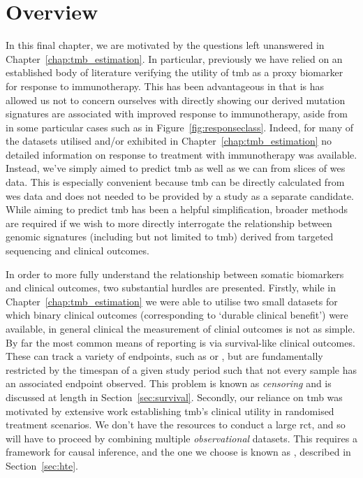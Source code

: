 \documentclass[../thesis.tex]{subfiles}
\begin{document}
\section{Overview}
In this final chapter, we are motivated by the questions left unanswered in Chapter~\ref{chap:tmb_estimation}. In particular, previously we have relied on an established body of literature verifying the utility of \gls{tmb} as a proxy biomarker for response to immunotherapy. This has been advantageous in that is has allowed us not to concern ourselves with directly showing our derived mutation signatures are associated with improved response to immunotherapy, aside from in some particular cases such as in Figure~\ref{fig:responseclass}. Indeed, for many of the datasets utilised and/or exhibited in Chapter~\ref{chap:tmb_estimation} no detailed information on response to treatment with immunotherapy was available. Instead, we've simply aimed to predict \gls{tmb} as well as we can from slices of \gls{wes} data. This is especially convenient because \gls{tmb} can be directly calculated from \gls{wes} data and does not needed to be provided by a study as a separate candidate.  While aiming to predict \gls{tmb} has been a helpful simplification, broader methods are required if we wish to more directly interrogate the relationship between genomic signatures (including but not limited to \gls{tmb}) derived from targeted sequencing and clinical outcomes. 

In order to more fully understand the relationship between somatic biomarkers and clinical outcomes, two substantial hurdles are presented. Firstly, while in Chapter~\ref{chap:tmb_estimation} we were able to utilise two small datasets for which binary clinical outcomes (corresponding to `durable clinical benefit') were available, in general clinical the measurement of clinial outcomes is not as simple. By far the most common means of reporting is via survival-like clinical outcomes. These can track a variety of endpoints, such as  or , but are fundamentally restricted by the timespan of a given study period such that not every sample has an associated endpoint observed. This problem is known as \textit{censoring} and is discussed at length in Section~\ref{sec:survival}. Secondly, our reliance on \gls{tmb} was motivated by extensive work establishing \gls{tmb}'s clinical utility in randomised treatment scenarios. We don't have the resources to conduct a large \gls{rct}, and so will have to proceed by combining multiple \emph{observational} datasets. This requires a framework for causal inference, and the one we choose is known as , described in Section~\ref{sec:hte}.
\end{document}
